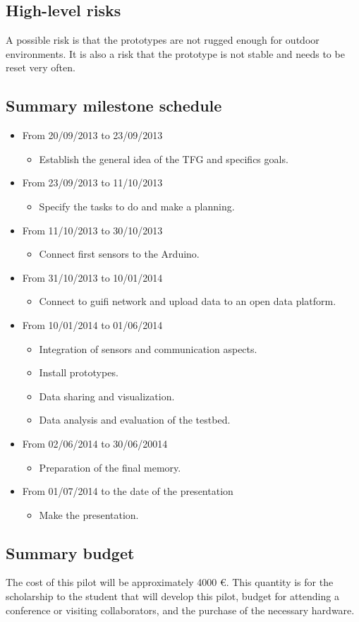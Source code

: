 \subsection{High-level risks}
A possible risk is that the prototypes are not rugged enough for outdoor environments.
It is also a risk that the prototype is not stable and needs to be reset very often.

\subsection{Summary milestone schedule}
\begin{itemize}
\item From 20/09/2013 to 23/09/2013
	\begin{itemize}
	\item Establish the general idea of the TFG and specifics goals.
	\end{itemize}
\item From 23/09/2013 to 11/10/2013
	\begin{itemize}
	\item Specify the tasks to do and make a planning.
	\end{itemize}
\item From 11/10/2013 to 30/10/2013
	\begin{itemize}
	\item Connect first sensors to the Arduino.
	\end{itemize}
\item From 31/10/2013 to 10/01/2014
	\begin{itemize}
	\item Connect to guifi network and upload data to an open data platform.
	\end{itemize}
\item From 10/01/2014 to 01/06/2014
	\begin{itemize}
	\item Integration of sensors and communication aspects.
	\item Install prototypes.
	\item Data sharing and visualization.
    \item Data analysis and evaluation of the testbed.
	\end{itemize}
\item From 02/06/2014 to 30/06/20014
	\begin{itemize}
	\item Preparation of the final memory.
	\end{itemize}
\item From 01/07/2014 to the date of the presentation
	\begin{itemize}
	\item Make the presentation.
	\end{itemize}
\end{itemize}

\subsection{Summary budget}
The cost of this pilot will be approximately 4000 \euro. This quantity is for the scholarship to the student that will develop this pilot, budget for attending a conference or visiting collaborators, and the purchase of the necessary hardware.
